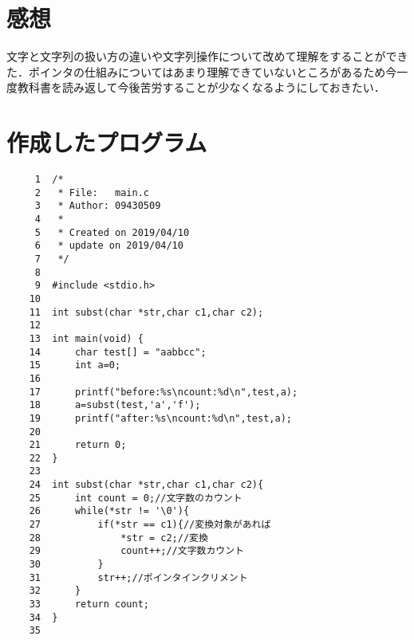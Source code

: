 \documentclass[a4j,11pt]{jarticle}
\begin{document}
\section{感想}
文字と文字列の扱い方の違いや文字列操作について改めて理解をすることができた．ポインタの仕組みについてはあまり理解できていないところがあるため今一度教科書を読み返して今後苦労することが少なくなるようにしておきたい．
\section{作成したプログラム}
\begin{verbatim}
     1	/* 
     2	 * File:   main.c
     3	 * Author: 09430509
     4	 *
     5	 * Created on 2019/04/10
     6	 * update on 2019/04/10
     7	 */
     8	
     9	#include <stdio.h>
    10	
    11	int subst(char *str,char c1,char c2);
    12	
    13	int main(void) {
    14	    char test[] = "aabbcc";
    15	    int a=0;
    16	    
    17	    printf("before:%s\ncount:%d\n",test,a);
    18	    a=subst(test,'a','f');
    19	    printf("after:%s\ncount:%d\n",test,a);
    20	    
    21	    return 0;
    22	}
    23	
    24	int subst(char *str,char c1,char c2){
    25	    int count = 0;//文字数のカウント
    26	    while(*str != '\0'){
    27	        if(*str == c1){//変換対象があれば
    28	            *str = c2;//変換
    29	            count++;//文字数カウント
    30	        }
    31	        str++;//ポインタインクリメント
    32	    }
    33	    return count;
    34	}
    35	

\end{verbatim}
\end{document}
